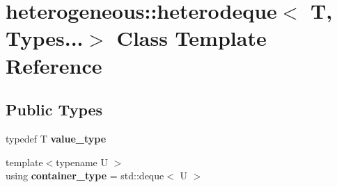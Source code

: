 \hypertarget{classheterogeneous_1_1heterodeque_3_01_t_00_01_types_8_8_8_4}{}\section{heterogeneous\+:\+:heterodeque$<$ T, Types...$>$ Class Template Reference}
\label{classheterogeneous_1_1heterodeque_3_01_t_00_01_types_8_8_8_4}
\subsection*{Public Types}
\begin{DoxyCompactItemize}
\item 
\hypertarget{classheterogeneous_1_1heterodeque_3_01_t_00_01_types_8_8_8_4_a9e1d49c796554ce5ef65d856f21745af}{}typedef T {\bfseries value\+\_\+type}\label{classheterogeneous_1_1heterodeque_3_01_t_00_01_types_8_8_8_4_a9e1d49c796554ce5ef65d856f21745af}

\item 
\hypertarget{classheterogeneous_1_1heterodeque_3_01_t_00_01_types_8_8_8_4_ae50030f6dfb661f2a5025c31dcb51d8a}{}{\footnotesize template$<$typename U $>$ }\\using {\bfseries container\+\_\+type} = std\+::deque$<$ U $>$\label{classheterogeneous_1_1heterodeque_3_01_t_00_01_types_8_8_8_4_ae50030f6dfb661f2a5025c31dcb51d8a}

\end{DoxyCompactItemize}
